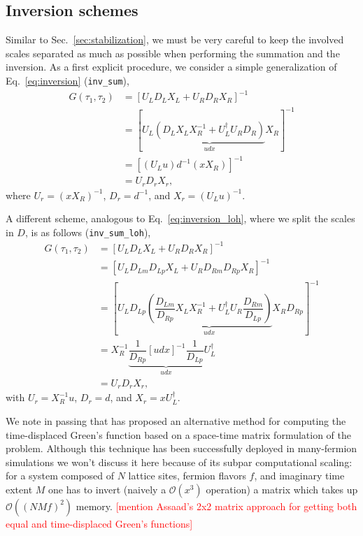 \documentclass[submission, Phys]{SciPost}
\newcommand{\todo}[1]{\textcolor{red}{[#1]}}
\begin{document}
\subsection{Inversion schemes}
Similar to Sec.~\ref{sec:stabilization}, we must be very careful to keep the involved scales separated as much as possible when performing the summation and the inversion.
As a first explicit procedure, we consider a simple generalization of Eq.~\ref{eq:inversion} (\texttt{inv\_sum}),
\begin{align}
	G(\tau_1, \tau_2) &= [U_L D_L X_L + U_R D_R X_R]^{-1} \nonumber\\
	&= [U_L \underbrace{(D_L X_L X_R^{-1} + U_L^\dagger U_R D_R)}_{udx} X_R ]^{-1} \nonumber\\
	&= [(U_L u) d^{-1} (x X_R)]^{-1} \label{eq:inversion_tdgf}\\
	&= U_r D_r X_r, \nonumber 
\end{align}
where $U_r = (x X_R)^{-1}$, $D_r = d^{-1}$, and $X_r = (U_L u)^{-1}$.

A different scheme, analogous to Eq.~\ref{eq:inversion_loh}, where we split the scales in $D$, is as follows (\texttt{inv\_sum\_loh}), \cite{Loh2005}
\begin{align}
	G(\tau_1, \tau_2) &= [U_L D_L X_L + U_R D_R X_R]^{-1} \nonumber\\
	&= [U_L D_{Lm} D_{Lp} X_L + U_R D_{Rm} D_{Rp} X_R]^{-1} \nonumber\\
	&= \left[U_L D_{Lp} \underbrace{\left( \dfrac{D_{Lm}}{D_{Rp}} X_L X_R^{-1} + U_L^\dagger U_R \dfrac{D_{Rm}}{D_{Lp}} \right)}_{udx} X_R D_{Rp} \right]^{-1} \nonumber\\
	&= X_R^{-1} \underbrace{\dfrac{1}{D_{Rp}} [udx]^{-1} \dfrac{1}{D_{Lp}}}_{udx} U_L^\dagger \label{eq:inversion_tdgf_loh} \\
	&= U_r D_r X_r, \nonumber
\end{align}
with $U_r = X_R^{-1} u$, $D_r = d$, and $X_r = x U_L^\dagger$.

We note in passing that \cite{Hirsch1988} has proposed an alternative method for computing the time-displaced Green's function based on a space-time matrix formulation of the problem. Although this technique has been successfully deployed in many-fermion simulations we won't discuss it here because of its subpar computational scaling: for a system composed of $N$ lattice sites, fermion flavors $f$, and imaginary time extent $M$ one has to invert (naively a $\mathcal{O}(x^3)$ operation) a matrix which takes up $\mathcal{O}((NMf)^2)$ memory. \todo{mention Assaad's 2x2 matrix approach for getting both equal and time-displaced Green's functions}
\end{document}
